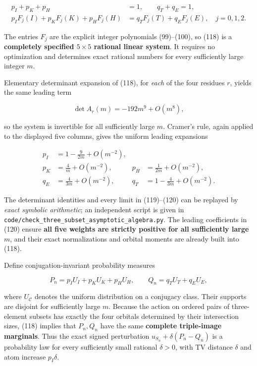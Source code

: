 \documentclass[
  11pt,
]{article}
\begin{document}
\[
\begin{aligned}
p_I+p_K+p_H&=1,\qquad q_T+q_E=1,\\
p_I F_j(I)+p_KF_j(K)+p_HF_j(H)
&=q_TF_j(T)+q_EF_j(E),\quad j=0,1,2.
\end{aligned}\tag{118}
\]

The entries \(F_j\) are the explicit integer polynomials (99)--(100), so
(118) is a \textbf{completely specified \(5\times5\) rational linear
system}. It requires no optimization and determines exact rational
numbers for every sufficiently large integer \(m\).

Elementary determinant expansion of (118), for \emph{each} of the four
residues \(r\), yields the same leading term

\[
\det A_r(m)=-192m^9+O(m^8), \tag{119}
\]

so the system is invertible for all sufficiently large \(m\). Cramer's
rule, again applied to the displayed five columns, gives the uniform
leading expansions

\[
\begin{aligned}
p_I&=1-\frac{9}{2m}+O(m^{-2}),\\
p_K&=\frac4m+O(m^{-2}),&
p_H&=\frac1{2m}+O(m^{-2}),\\
q_E&=\frac4{3m}+O(m^{-2}),&
q_T&=1-\frac4{3m}+O(m^{-2}).
\end{aligned}\tag{120}
\]

The determinant identities and every limit in (119)--(120) can be
replayed by \emph{exact symbolic arithmetic}; an independent script is
given in \nolinkurl{code/check_three_subset_asymptotic_algebra.py}. The
leading coefficients in (120) ensure \textbf{all five weights are
strictly positive for all sufficiently large \(m\)}, and their exact
normalizations and orbital moments are already built into (118).

Define conjugation-invariant probability measures

\[
P_n=p_I U_I+p_KU_K+p_HU_H,\qquad
Q_n=q_TU_T+q_EU_E, \tag{121}
\]

where \(U_\mathcal C\) denotes the uniform distribution on a conjugacy
class. Their supports are disjoint for sufficiently large \(m\). Because
the action on ordered pairs of three-element subsets has exactly the
four orbitals determined by their intersection sizes, (118) implies that
\(P_n,Q_n\) have the same \textbf{complete triple-image marginals}. Thus
the exact signed perturbation \(u_{S_n}+\delta(P_n-Q_n)\) is a
probability law for every sufficiently small rational \(\delta>0\), with
TV distance \(\delta\) and atom increase \(p_I\delta\).
\end{document}
